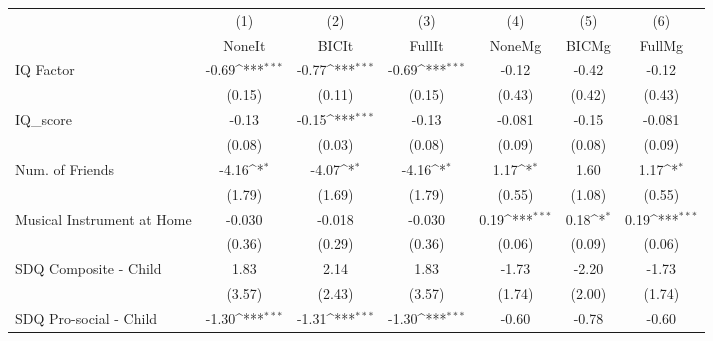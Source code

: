 {
\def\sym#1{\ifmmode^{#1}\else\(^{#1}\)\fi}
\begin{tabular}{l*{6}{c}}
\toprule
            &\multicolumn{1}{c}{(1)}&\multicolumn{1}{c}{(2)}&\multicolumn{1}{c}{(3)}&\multicolumn{1}{c}{(4)}&\multicolumn{1}{c}{(5)}&\multicolumn{1}{c}{(6)}\\
            &\multicolumn{1}{c}{NoneIt}&\multicolumn{1}{c}{BICIt}&\multicolumn{1}{c}{FullIt}&\multicolumn{1}{c}{NoneMg}&\multicolumn{1}{c}{BICMg}&\multicolumn{1}{c}{FullMg}\\
\midrule
IQ Factor   &       -0.69\sym{***}&       -0.77\sym{***}&       -0.69\sym{***}&       -0.12         &       -0.42         &       -0.12         \\
            &      (0.15)         &      (0.11)         &      (0.15)         &      (0.43)         &      (0.42)         &      (0.43)         \\
\addlinespace
IQ\_score    &       -0.13         &       -0.15\sym{***}&       -0.13         &      -0.081         &       -0.15         &      -0.081         \\
            &      (0.08)         &      (0.03)         &      (0.08)         &      (0.09)         &      (0.08)         &      (0.09)         \\
\addlinespace
Num. of Friends&       -4.16\sym{*}  &       -4.07\sym{*}  &       -4.16\sym{*}  &        1.17\sym{*}  &        1.60         &        1.17\sym{*}  \\
            &      (1.79)         &      (1.69)         &      (1.79)         &      (0.55)         &      (1.08)         &      (0.55)         \\
\addlinespace
Musical Instrument at Home&      -0.030         &      -0.018         &      -0.030         &        0.19\sym{***}&        0.18\sym{*}  &        0.19\sym{***}\\
            &      (0.36)         &      (0.29)         &      (0.36)         &      (0.06)         &      (0.09)         &      (0.06)         \\
\addlinespace
SDQ Composite - Child&        1.83         &        2.14         &        1.83         &       -1.73         &       -2.20         &       -1.73         \\
            &      (3.57)         &      (2.43)         &      (3.57)         &      (1.74)         &      (2.00)         &      (1.74)         \\
\addlinespace
SDQ Pro-social - Child&       -1.30\sym{***}&       -1.31\sym{***}&       -1.30\sym{***}&       -0.60         &       -0.78         &       -0.60         \\

\end{tabular}}
